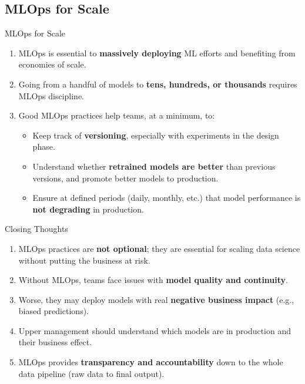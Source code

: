 \subsection{MLOps for Scale}

\begin{frame}{MLOps for Scale}
\begin{enumerate}
\item<1-> MLOps is essential to \textbf{massively deploying} ML efforts and benefiting from economies of scale.
\item<2-> Going from a handful of models to \textbf{tens, hundreds, or thousands} requires MLOps discipline.
\item<3-> Good MLOps practices help teams, at a minimum, to:
    \begin{itemize}
    \item Keep track of \textbf{versioning}, especially with experiments in the design phase.
    \item Understand whether \textbf{retrained models are better} than previous versions, and promote better models to production.
    \item Ensure at defined periods (daily, monthly, etc.) that model performance is \textbf{not degrading} in production.
    \end{itemize}
\end{enumerate}
\end{frame}

\begin{frame}{Closing Thoughts}
\begin{enumerate}
\item<1-> MLOps practices are \textbf{not optional}; they are essential for scaling data science without putting the business at risk.
\item<2-> Without MLOps, teams face issues with \textbf{model quality and continuity}.
\item<3-> Worse, they may deploy models with real \textbf{negative business impact} (e.g., biased predictions).
\item<4-> Upper management should understand which models are in production and their business effect.
\item<5-> MLOps provides \textbf{transparency and accountability} down to the whole data pipeline (raw data to final output).
\end{enumerate}
\end{frame}

